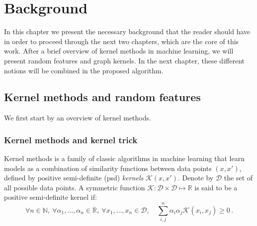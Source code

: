 \newcommand{\todoNK}[1]{\textbf{\textcolor{red}{NK: #1}}}
\chapter{Background}
\label{chapter:background}
\newtheorem{theorem}{Theorem}
In this chapter we present the necessary background that the reader should have in order to proceed through the next two chapters, which are the core of this work. After a brief overview of kernel methods in machine learning, we will present random features and graph kernels. In the next chapter, these different notions will be combined in the proposed algorithm.

\section{Kernel methods and random features}

We first start by an overview of kernel methods.

\subsection{Kernel methods and kernel trick}
Kernel methods is a family of classic algorithms in machine learning that learn models as a combination of similarity functions between data points $(x,x')$, defined by positive semi-definite (psd) \emph{kernels} $\mathcal{K}(x,x')$. Denote by $\mathcal{D}$ the set of all possible data points. A symmetric function $\mathcal{K}:\mathcal{D}\times\mathcal{D}\mapsto\mathbb{R}$ is said to be a positive semi-definite kernel if:
\begin{equation}
\forall n\in \mathbb{N},~\forall \alpha_1,\ldots,\alpha_n\in \mathbb{R},~\forall x_1,\ldots,x_n\in \mathcal{D},\quad \sum_{i,j}^n\alpha_i\alpha_j\mathcal{K}(x_i,x_j)\geq 0 \, .
\end{equation}

